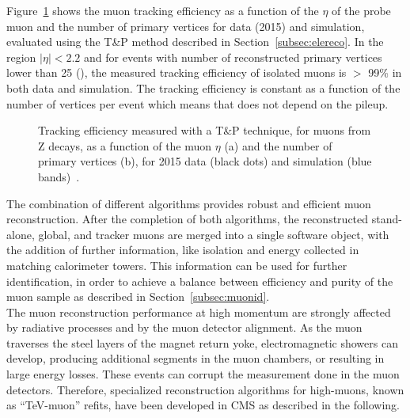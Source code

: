 Figure~\ref{fig:mu_reco_eff} shows the muon tracking efficiency as a function of the $\eta$ of the probe muon and the number of primary vertices for data (2015) and simulation, evaluated using the T\&P method described in Section~\ref{subsec:elereco}. In the region $|\eta| < 2.2$ and for events with number of reconstructed primary vertices lower than 25 (), the measured tracking efficiency of isolated muons is $>$ 99\% in both data and simulation. The tracking efficiency is constant as a function of the number of vertices per event which means that does not depend on the pileup.

\begin{figure}[!htb]
\centering
{}
\caption{Tracking efficiency measured with a T\&P technique, for muons from Z decays, as a function of the muon $\eta$ (a) and the number of primary vertices (b), for 2015 data (black dots) and simulation (blue bands)~\cite{CMS-DP-2015-016}.}
\label{fig:mu_reco_eff}
\end{figure}

The combination of different algorithms provides robust and efficient muon reconstruction.
After the completion of both algorithms, the reconstructed stand-alone, global, and tracker muons are merged into a single software object, with the addition of further information, like isolation and energy collected in matching calorimeter towers. This information can be used for further identification, in order to achieve a balance between efficiency and purity of the muon sample as described in Section~\ref{subsec:muonid}.\\

The muon reconstruction performance at high momentum are strongly affected by radiative processes and by the muon detector alignment. As the muon traverses the steel layers of the magnet return yoke, electromagnetic showers can develop, producing additional segments in the muon chambers, or resulting in large energy losses. These events can corrupt the measurement done in the muon detectors. Therefore, specialized reconstruction algorithms for high-\pt muons, known as ``TeV-muon'' refits, have been developed in CMS as described in the following.

